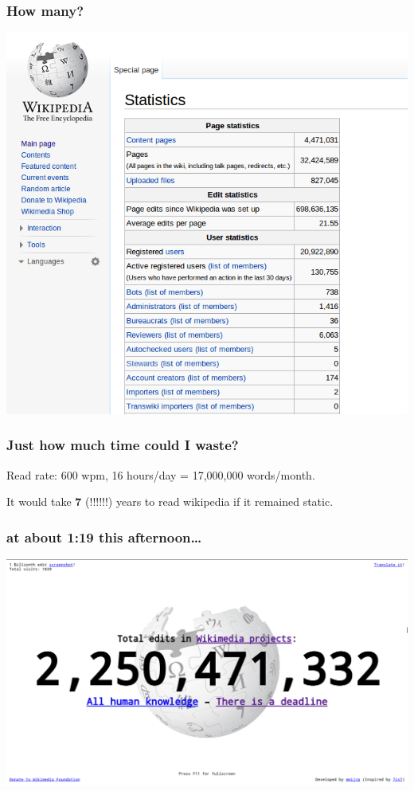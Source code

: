 \documentclass{beamer}
\begin{document}
\begin{frame}
  \frametitle{How many?}
  \begin{center}
    \includegraphics[height = 0.8\textheight, keepaspectratio = true]{figure/wiki_stats}
  \end{center}
\end{frame}

\begin{frame}
  \frametitle{Just how much time could I waste?}

  Read rate: 600 wpm, 16 hours/day = 17,000,000 words/month. 
  
  It would take \textbf{7} (!!!!!!) years to read wikipedia if it remained static. 
\end{frame}

\begin{frame}
  \frametitle{at about 1:19 this afternoon\ldots}
  \begin{center}
    \includegraphics[height = 0.8\textheight, width = \textwidth, keepaspectratio = true]{figure/edits}
  \end{center}
\end{frame}
\end{document}
